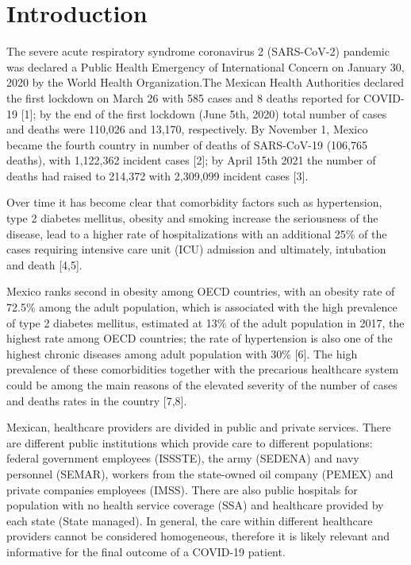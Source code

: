 \documentclass[10pt,letterpaper]{article}
\begin{document}
\hypertarget{introduction}{%
\section{Introduction}\label{introduction}}

The severe acute respiratory syndrome coronavirus 2 (SARS-CoV-2)
pandemic was declared a Public Health Emergency of International Concern
on January 30, 2020 by the World Health Organization.The Mexican Health
Authorities declared the first lockdown on March 26 with 585 cases and 8
deaths reported for COVID-19 {[}1{]}; by the end of the first lockdown
(June 5th, 2020) total number of cases and deaths were 110,026 and
13,170, respectively. By November 1, Mexico became the fourth country in
number of deaths of SARS-CoV-19 (106,765 deaths), with 1,122,362
incident cases {[}2{]}; by April 15th 2021 the number of deaths had
raised to 214,372 with 2,309,099 incident cases {[}3{]}.

Over time it has become clear that comorbidity factors such as
hypertension, type 2 diabetes mellitus, obesity and smoking increase the
seriousness of the disease, lead to a higher rate of hospitalizations
with an additional 25\% of the cases requiring intensive care unit (ICU)
admission and ultimately, intubation and death {[}4,5{]}.

Mexico ranks second in obesity among OECD countries, with an obesity
rate of 72.5\% among the adult population, which is associated with the
high prevalence of type 2 diabetes mellitus, estimated at 13\% of the
adult population in 2017, the highest rate among OECD countries; the
rate of hypertension is also one of the highest chronic diseases among
adult population with 30\% {[}6{]}. The high prevalence of these
comorbidities together with the precarious healthcare system could be
among the main reasons of the elevated severity of the number of cases
and deaths rates in the country {[}7,8{]}.

Mexican, healthcare providers are divided in public and private
services. There are different public institutions which provide care to
different populations: federal government employees (ISSSTE), the army
(SEDENA) and navy personnel (SEMAR), workers from the state-owned oil
company (PEMEX) and private companies employees (IMSS). There are also
public hospitals for population with no health service coverage (SSA)
and healthcare provided by each state (State managed). In general, the
care within different healthcare providers cannot be considered
homogeneous, therefore it is likely relevant and informative for the
final outcome of a COVID-19 patient.
\end{document}
